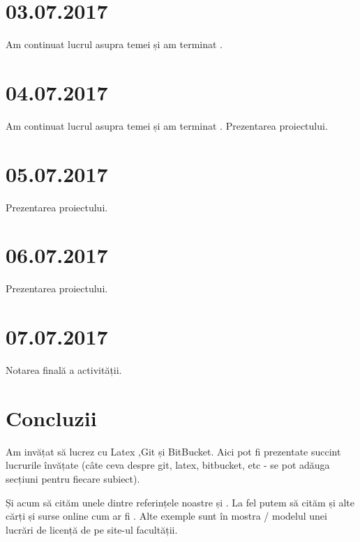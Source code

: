 \documentclass{report}
\begin{document}
\chapter{03.07.2017}
Am continuat lucrul asupra temei și am terminat .
\chapter{04.07.2017}
Am continuat lucrul asupra temei și am terminat .
Prezentarea proiectului.
\chapter{05.07.2017}
Prezentarea proiectului.
\chapter{06.07.2017}
Prezentarea proiectului.
\chapter{07.07.2017}

Notarea finală a activității.

\chapter{Concluzii}
Am invățat să lucrez cu Latex ,Git și BitBucket. Aici pot fi prezentate succint lucrurile învățate (câte ceva despre git, latex, bitbucket, etc - se pot adăuga secțiuni pentru fiecare subiect). 

Și acum să cităm unele dintre referințele noastre \cite{DUMMY:1} și \cite{book:25008}. La fel putem să cităm și alte cărți și surse online cum ar fi \cite{book:776133, book:1045183}. Alte exemple sunt în mostra / modelul unei lucrări de licență de pe site-ul facultății. 


 

\end{document}
